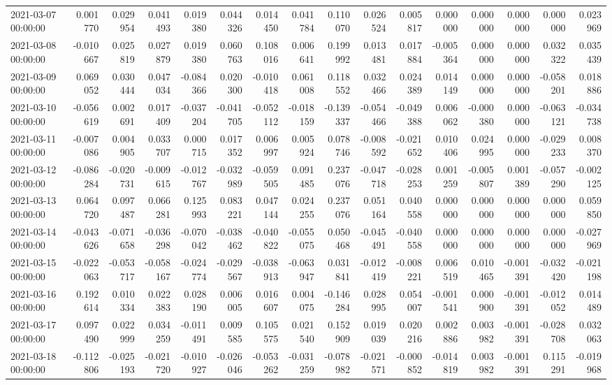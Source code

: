 \begin{tabular}{lrrrrrrrrrrrrrrr}
2021-03-07 00:00:00 & 0.001770 & 0.029954 & 0.041493 & 0.019380 & 0.044326 & 0.014450 & 0.041784 & 0.110070 & 0.026524 & 0.005817 & 0.000000 & 0.000000 & 0.000000 & 0.000000 & 0.023969 \\
2021-03-08 00:00:00 & -0.010667 & 0.025819 & 0.027879 & 0.019380 & 0.060763 & 0.108016 & 0.006641 & 0.199992 & 0.013481 & 0.017884 & -0.005364 & 0.000000 & 0.000000 & 0.032322 & 0.035439 \\
2021-03-09 00:00:00 & 0.069052 & 0.030444 & 0.047034 & -0.084366 & 0.020300 & -0.010418 & 0.061008 & 0.118552 & 0.032466 & 0.024389 & 0.014149 & 0.000000 & 0.000000 & -0.058201 & 0.018886 \\
2021-03-10 00:00:00 & -0.056619 & 0.002691 & 0.017409 & -0.037204 & -0.041705 & -0.052112 & -0.018159 & -0.139337 & -0.054466 & -0.049388 & 0.006062 & -0.000380 & 0.000000 & -0.063121 & -0.034738 \\
2021-03-11 00:00:00 & -0.007086 & 0.004905 & 0.033707 & 0.000715 & 0.017352 & 0.006997 & 0.005924 & 0.078746 & -0.008592 & -0.021652 & 0.010406 & 0.024995 & 0.000000 & -0.029233 & 0.008370 \\
2021-03-12 00:00:00 & -0.086284 & -0.020731 & -0.009615 & -0.012767 & -0.032989 & -0.059505 & 0.091485 & 0.237076 & -0.047718 & -0.028253 & 0.001259 & -0.005807 & 0.001389 & -0.057290 & -0.002125 \\
2021-03-13 00:00:00 & 0.064720 & 0.097487 & 0.066281 & 0.125993 & 0.083221 & 0.047144 & 0.024255 & 0.237076 & 0.051164 & 0.040558 & 0.000000 & 0.000000 & 0.000000 & 0.000000 & 0.059850 \\
2021-03-14 00:00:00 & -0.043626 & -0.071658 & -0.036298 & -0.070042 & -0.038462 & -0.040822 & -0.055075 & 0.050468 & -0.045491 & -0.040558 & 0.000000 & 0.000000 & 0.000000 & 0.000000 & -0.027969 \\
2021-03-15 00:00:00 & -0.022063 & -0.053717 & -0.058167 & -0.024774 & -0.029567 & -0.038913 & -0.063947 & 0.031841 & -0.012419 & -0.008221 & 0.006519 & 0.010465 & -0.001391 & -0.032420 & -0.021198 \\
2021-03-16 00:00:00 & 0.192614 & 0.010334 & 0.022383 & 0.028190 & 0.006005 & 0.016607 & 0.004075 & -0.146284 & 0.028995 & 0.054007 & -0.001541 & 0.000900 & -0.001391 & -0.012052 & 0.014489 \\
2021-03-17 00:00:00 & 0.097490 & 0.022999 & 0.034259 & -0.011491 & 0.009585 & 0.105575 & 0.021540 & 0.152909 & 0.019039 & 0.020216 & 0.002886 & 0.003982 & -0.001391 & -0.028708 & 0.032063 \\
2021-03-18 00:00:00 & -0.112806 & -0.025193 & -0.021720 & -0.010927 & -0.026046 & -0.053262 & -0.031259 & -0.078982 & -0.021571 & -0.000852 & -0.014819 & 0.003982 & -0.001391 & 0.115291 & -0.019968 \\

\end{tabular}
